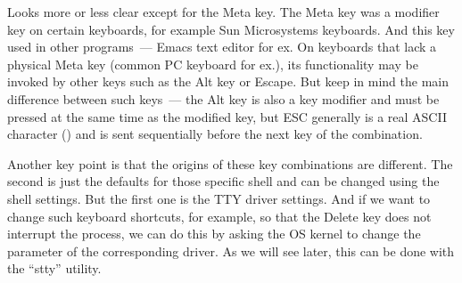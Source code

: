 Looks more or less clear except for the Meta key. The Meta key was a modifier
key on certain keyboards, for example Sun Microsystems keyboards. And this key
used in other programs~--- Emacs text editor for ex. On keyboards that lack
a physical Meta key (common PC keyboard for ex.), its functionality may be
invoked by other keys such as the Alt key or Escape. But keep in mind the main
difference between such keys~--- the Alt key is also a key modifier and must be
pressed at the same time as the modified key, but ESC generally is
a real ASCII character () and
is sent sequentially before the next key of the combination.

Another key point is that the origins of these key combinations are different.
The second is just the defaults for those specific shell and can be changed
using the shell settings. But the first one is the TTY driver settings.
And if we want to change such keyboard shortcuts, for example, so that
the Delete key does not interrupt the process, we can do this by asking
the OS kernel to change the parameter of the corresponding driver.
As we will see later, this can be done with the ``stty'' utility.
